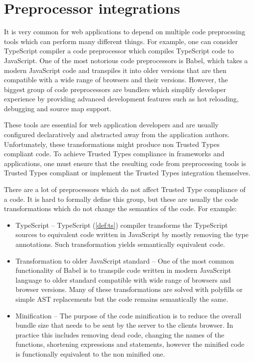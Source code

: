 \chapter{Preprocessor integrations}

It is very common for web applications to depend on multiple code preprocssing tools which can
perform many different things. For example, one can consider TypeScript compiler a code preprocessor
which compiles TypeScript code to JavaScript. One of the most notorious code preprocessors is Babel,
which takes a modern JavaScript code and transpiles it into older versions that are then compatible
with a wide range of browsers and their versions. However, the biggest group of code preprocessors
are bundlers which simplify developer experience by providing advanced development features such as
hot reloading, debugging and source map support.

These tools are essential for web application developers and are usually configured declaratively
and abstracted away from the application authors. Unfortunately, these transformations might produce
non Trusted Types compliant code. To achieve Trusted Types compliance in frameworks and
applications, one must ensure that the resulting code from preprocessing tools is Trusted Types
compliant or implement the Trusted Types integration themselves.

There are a lot of preprocessors which do not affect Trusted Type compliance of a code. It is hard
to formally define this group, but these are usually the code transformations which do not change
the semantics of the code. For example:

\begin{itemize}
  \item TypeScript -- TypeScript (\ref{def:ts}) compiler transforms the TypeScript sources to
        equivalent code written in JavaScript by mostly removing the type annotations. Such
        transformation yields semantically equivalent code.
  \item Transformation to older JavaScript standard -- One of the most common functionality of Babel
        is to transpile code written in modern JavaScript language to older standard compatible with
        wide range of browsers and browser versions. Many of these transformations are solved with
        polyfills or simple AST replacements but the code remains semantically the same.
  \item Minification -- The purpose of the code minification is to reduce the
        overall bundle size that needs to be sent by the server to the clients browser. In practice
        this includes removing dead code, changing the names of the functions, shortening
        expressions and statements, however the minified code is functionally equivalent to the non
        minified one.
\end{itemize}

